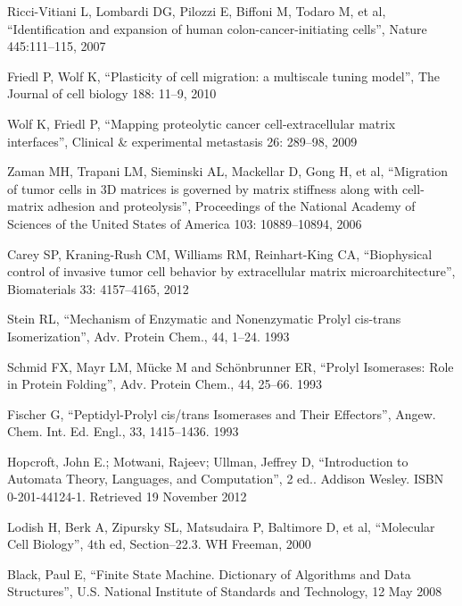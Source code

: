 \begin{thebibliography}{}
 Ricci-Vitiani L, Lombardi DG, Pilozzi E, Biffoni M, Todaro M, et al, 
``Identification and expansion of human colon-cancer-initiating cells'', 
Nature 445:111–115, 2007

 Friedl P, Wolf K, 
``Plasticity of cell migration: a multiscale tuning model'', 
The Journal of cell biology 188: 11–9, 2010 

 Wolf K, Friedl P, 
``Mapping proteolytic cancer cell-extracellular matrix interfaces'', 
Clinical \& experimental metastasis 26: 289–98, 2009

 Zaman MH, Trapani LM, Sieminski AL, Mackellar D, Gong H, et al, 
``Migration of tumor cells in 3D matrices is governed by matrix stiffness along with cell-matrix adhesion and proteolysis'', 
Proceedings of the National Academy of Sciences of the United States of America 103: 10889–10894, 2006

 Carey SP, Kraning-Rush CM, Williams RM, Reinhart-King CA, 
``Biophysical control of invasive tumor cell behavior by extracellular matrix microarchitecture'', 
Biomaterials 33: 4157–4165, 2012

 Stein RL, 
``Mechanism of Enzymatic and Nonenzymatic Prolyl cis-trans Isomerization'', 
Adv. Protein Chem., 44, 1–24. 1993

 Schmid FX, Mayr LM, Mücke M and Schönbrunner ER, 
``Prolyl Isomerases: Role in Protein Folding'', 
Adv. Protein Chem., 44, 25–66. 1993

 Fischer G, 
``Peptidyl-Prolyl cis/trans Isomerases and Their Effectors'', 
Angew. Chem. Int. Ed. Engl., 33, 1415–1436. 1993

 Hopcroft, John E.; Motwani, Rajeev; Ullman, Jeffrey D, 
``Introduction to Automata Theory, Languages, and Computation'', 
2 ed.. Addison Wesley. ISBN 0-201-44124-1. Retrieved 19 November 2012

 Lodish H, Berk A, Zipursky SL, Matsudaira P, Baltimore D, et al, 
``Molecular Cell Biology'', 
4th ed, Section–22.3. WH Freeman, 2000

 Black, Paul E, 
``Finite State Machine. Dictionary of Algorithms and Data Structures'', 
U.S. National Institute of Standards and Technology, 12 May 2008


\end{thebibliography}
